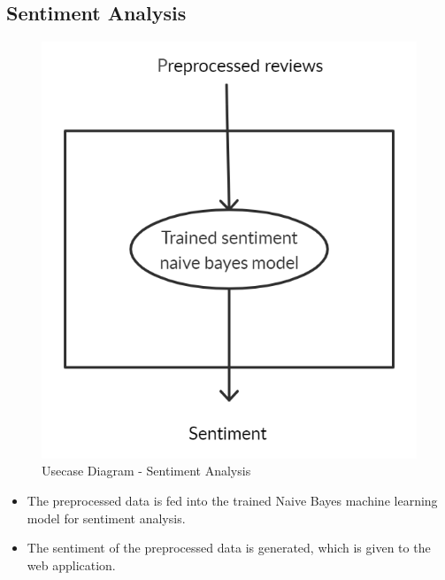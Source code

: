 \documentclass[11pt]{report}
\begin{document}
\subsection{Sentiment Analysis}
\begin{figure}[H]
\centering
\includegraphics[scale=0.5]{images/sentiment_usecase.png}
\caption{Usecase Diagram - Sentiment Analysis}
\label{fig:usecase4}
\end{figure}

\begin{itemize}
    \item The preprocessed data is fed into the trained Naive Bayes machine learning model for sentiment analysis.
    \item The sentiment of the preprocessed data is generated, which is given to the web application.\\ 
\end{itemize}

\pagebreak
\end{document}
